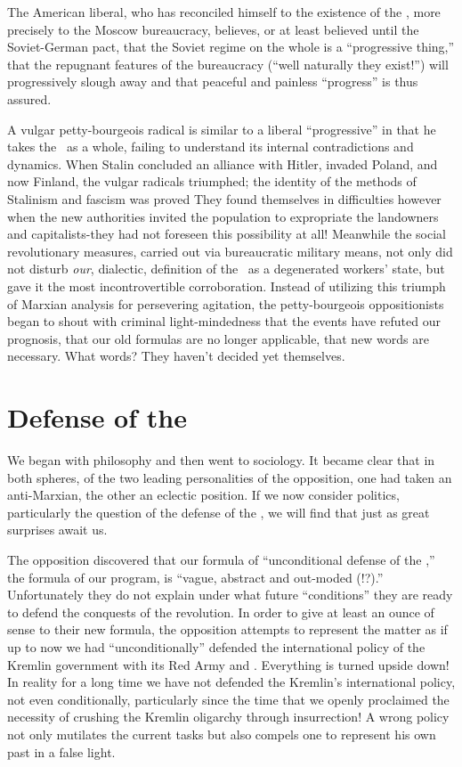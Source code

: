 The American liberal, who has reconciled himself to the existence of the \USSR, more precisely to the Moscow bureaucracy, believes, or at least believed until the Soviet-German pact, that the Soviet regime on the whole is a “progressive thing,” that the repugnant features of the bureaucracy (“well naturally they exist!”) will progressively slough away and that peaceful and painless “progress” is thus assured.

A vulgar petty-bourgeois radical is similar to a liberal “progressive” in that he takes the \USSR\ as a whole, failing to understand its internal contradictions and dynamics. When Stalin concluded an alliance with Hitler, invaded Poland, and now Finland, the vulgar radicals triumphed; the identity of the methods of Stalinism and fascism was proved They found themselves in difficulties however when the new authorities invited the population to expropriate the landowners and capitalists-they had not foreseen this possibility at all! Meanwhile the social revolutionary measures, carried out via bureaucratic military means, not only did not disturb \emph{our}, dialectic, definition of the \USSR\ as a degenerated workers’ state, but gave it the most incontrovertible corroboration. Instead of utilizing this triumph of Marxian analysis for persevering agitation, the petty-bourgeois oppositionists began to shout with criminal light-mindedness that the events have refuted our prognosis, that our old formulas are no longer applicable, that new words are necessary. What words? They haven’t decided yet themselves.

\section*{Defense of the \USSR}

We began with philosophy and then went to sociology. It became clear that in both spheres, of the two leading personalities of the opposition, one had taken an anti-Marxian, the other an eclectic position. If we now consider politics, particularly the question of the defense of the \USSR, we will find that just as great surprises await us.

The opposition discovered that our formula of “unconditional defense of the \USSR,” the formula of our program, is “vague, abstract and out-moded (!?).” Unfortunately they do not explain under what future “conditions” they are ready to defend the conquests of the revolution. In order to give at least an ounce of sense to their new formula, the opposition attempts to represent the matter as if up to now we had “unconditionally” defended the international policy of the Kremlin government with its Red Army and \GPU. Everything is turned upside down! In reality for a long time we have not defended the Kremlin’s international policy, not even conditionally, particularly since the time that we openly proclaimed the necessity of crushing the Kremlin oligarchy through insurrection! A wrong policy not only mutilates the current tasks but also compels one to represent his own past in a false light.

